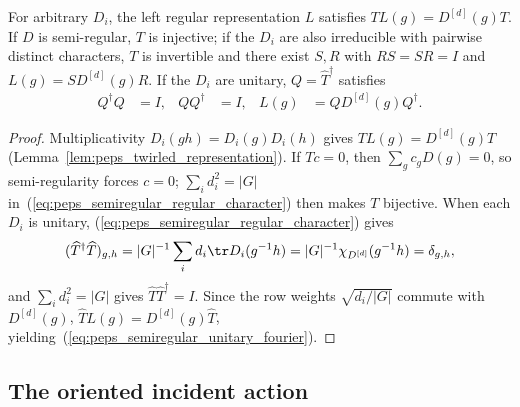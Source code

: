 \begin{lemma}%
    \label{thm:peps_semiregular_block_fourier}
    \leanok
    For arbitrary $D_i$, the left regular representation $L$ satisfies
    $TL(g)=D^{[d]}(g)T$. If $D$ is semi-regular, $T$ is injective; if the
    $D_i$ are also irreducible with pairwise distinct characters, $T$ is
    invertible and there exist $S,R$ with $RS=SR=I$ and $L(g)=SD^{[d]}(g)R$.
    If the $D_i$ are unitary, $Q=\widehat T^\dagger$ satisfies
    \begin{align}
        Q^\dagger Q & = I, & QQ^\dagger & = I, & L(g) & = QD^{[d]}(g)Q^\dagger.
        \label{eq:peps_semiregular_unitary_fourier}
    \end{align}
\end{lemma}
\begin{proof}\leanok
    Multiplicativity $D_i(gh)=D_i(g)D_i(h)$ gives $TL(g)=D^{[d]}(g)T$
    (Lemma~\ref{lem:peps_twirled_representation}). If $Tc=0$, then
    $\sum_gc_gD(g)=0$, so semi-regularity forces $c=0$; $\sum_i d_i^2=|G|$
    in~(\ref{eq:peps_semiregular_regular_character}) then makes $T$
    bijective. When each $D_i$ is unitary,
    (\ref{eq:peps_semiregular_regular_character}) gives
    \begin{align}
        (\widehat T^\dagger\widehat T)_{g,h}
        =|G|^{-1}\sum_id_i\tr D_i(g^{-1}h)
        =|G|^{-1}\chi_{D^{[d]}}(g^{-1}h)
        =\delta_{g,h},
    \end{align}
    and $\sum_i d_i^2=|G|$ gives $\widehat T\widehat T^\dagger=I$. Since the
    row weights $\sqrt{d_i/|G|}$ commute with $D^{[d]}(g)$,
    $\widehat TL(g)=D^{[d]}(g)\widehat T$, yielding~(\ref{eq:peps_semiregular_unitary_fourier}).
\end{proof}

\subsection{The oriented incident action}

